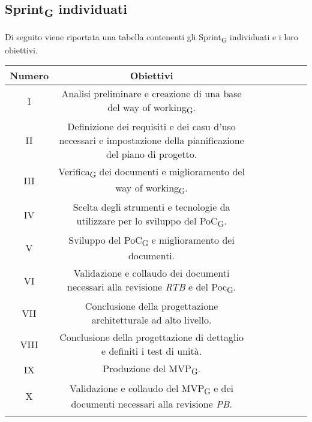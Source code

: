 \subsection{Sprint\textsubscript{G} individuati}
Di seguito viene riportata una tabella contenenti gli Sprint\textsubscript{G} individuati e i loro obiettivi.

\setlength\extrarowheight{5pt}
	\begin{tabularx}{\textwidth}{|ccccccc|c|}
		\hline
		\rowcolor{white}
		\textbf{Numero} & \textbf{Obiettivi}\\
		\hline
		I &  Analisi preliminare e creazione di una base del way of working\textsubscript{G}. \\
		II & Definizione dei requisiti e dei casu d'uso necessari e impostazione della pianificazione del piano di progetto. \\
		III & Verifica\textsubscript{G} dei documenti e miglioramento del way of working\textsubscript{G}. \\
		IV & Scelta degli strumenti e tecnologie da utilizzare per lo sviluppo del PoC\textsubscript{G}. \\
		V & Sviluppo del PoC\textsubscript{G} e miglioramento dei documenti. \\
		VI & Validazione e collaudo dei documenti necessari alla revisione \textit{RTB} e del Poc\textsubscript{G}.\\
		VII & Conclusione della progettazione architetturale ad alto livello. \\
		VIII & Conclusione della progettazione di dettaglio e definiti i test di unità. \\
		IX & Produzione del MVP\textsubscript{G}. \\
		X & Validazione e collaudo del MVP\textsubscript{G} e dei documenti necessari alla revisione \textit{PB}.\\
		\hline
		\rowcolor{white}
		\caption{ Sprint individuati}
	\end{tabularx}